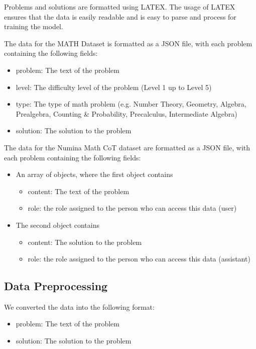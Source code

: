 \documentclass{article}
\begin{document}
Problems and solutions are formatted using LATEX. The usage of LATEX ensures that the data is easily readable and is easy to parse and process for training the model.

The data for the MATH Dataset is formatted as a JSON file, with each problem containing the following fields:
\begin{itemize}
  \item problem: The text of the problem
  \item level: The difficulty level of the problem (Level 1 up to Level 5)
  \item type: The type of math problem (e.g. Number Theory, Geometry, Algebra, Prealgebra, Counting \& Probability, Precalculus, Intermediate Algebra)
  \item solution: The solution to the problem
\end{itemize}

The data for the Numina Math CoT dataset are formatted as a JSON file, with each problem containing the following fields:
\begin{itemize}
  \item An array of objects, where the first object contains
      \begin{itemize}
        \item content: The text of the problem
        \item role: the role assigned to the person who can access this data (user)
      \end{itemize}
  \item The second object contains
      \begin{itemize}
        \item content: The solution to the problem
        \item role: the role assigned to the person who can access this data (assistant)
      \end{itemize}
\end{itemize}

\subsection{Data Preprocessing}

We converted the data into the following format:
\begin{itemize}
  \item problem: The text of the problem
  \item solution: The solution to the problem
\end{itemize}
\end{document}
